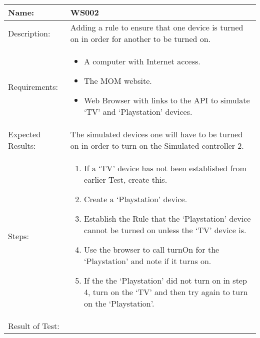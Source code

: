 \begin{table}[h]
	\centering
		\begin{tabular*}{\textwidth}{|l|l|}
		\hline
		\hline
		Name: & WS002\\
		\hline
		Description: & Adding a rule to ensure that one device is turned on in order for another to be turned on.\\
		\hline
		Requirements: & \parbox{0.85\textwidth}{
		\begin{itemize}
			\item A computer with Internet access.
			\item The MOM website.
			\item Web Browser with links to the API to simulate `TV' and `Playstation' devices.
		\end{itemize}}
		\\
		\hline
		Expected Results: & \parbox{.85\textwidth}{The simulated devices one will have to be turned on in order to turn on the Simulated controller 2.}\\
		\hline
		Steps: & \parbox{.85\textwidth}{
		\begin{enumerate}
			\item If a `TV' device has not been established from earlier Test, create this.
			\item Create a `Playstation' device.
			\item Establish the Rule that the `Playstation' device cannot be turned on unless the `TV' device is.
			\item Use the browser to call turnOn for the `Playstation' and note if it turns on.
			\item If the the `Playstation' did not turn on in step 4, turn on the `TV' and then try again to turn on the `Playstation'.
		\end{enumerate}}
		\\		
		\hline
		Result of Test: & \\
		\hline
		\end{tabular*}
\end{table}
